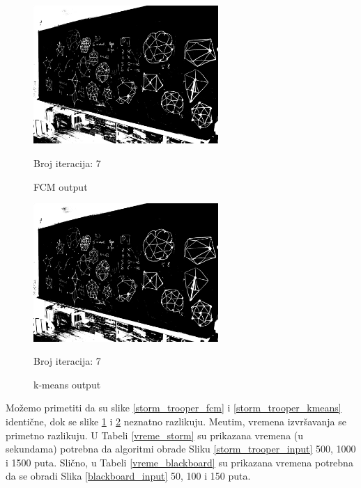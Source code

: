 \documentclass[12pt,a4paper]{article}
\theoremstyle{definition}
\theoremstyle{remark}
\theoremstyle{plain}
\begin{document}
\begin{multicols}{2}
\begin{figure}[H]
\centering
\includegraphics[width=7cm]{images/blackboard_binarized_fcm.png}
  \caption{FCM output}\label{blackboard_fcm}
 Broj iteracija: 7
\end{figure}
\columnbreak
\begin{figure}[H]
\centering
\includegraphics[width=7cm]{images/blackboard_binarized_kmeans.png}
  \caption{k-means output}\label{blackboard_kmeans}
  Broj iteracija: 7
\end{figure}
\end{multicols}

Mo\v zemo primetiti da su slike \ref{storm_trooper_fcm} i \ref{storm_trooper_kmeans} identi\v cne, dok se slike \ref{blackboard_fcm} i \ref{blackboard_kmeans} neznatno razlikuju. Me\dj utim, vremena izvr\v savanja se primetno razlikuju. U Tabeli \ref{vreme_storm} su prikazana vremena (u sekundama) potrebna da algoritmi obrade Sliku \ref{storm_trooper_input} 500, 1000 i 1500 puta. Sli\v cno, u Tabeli \ref{vreme_blackboard} su prikazana vremena potrebna da se obradi Slika \ref{blackboard_input} 50, 100 i 150 puta.
\end{document}
